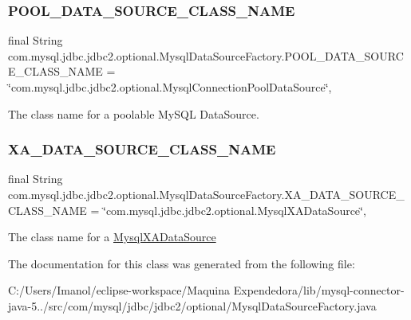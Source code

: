 \subsubsection{\texorpdfstring{P\+O\+O\+L\+\_\+\+D\+A\+T\+A\+\_\+\+S\+O\+U\+R\+C\+E\+\_\+\+C\+L\+A\+S\+S\+\_\+\+N\+A\+ME}{POOL\_DATA\_SOURCE\_CLASS\_NAME}}
{\footnotesize\ttfamily final String com.\+mysql.\+jdbc.\+jdbc2.\+optional.\+Mysql\+Data\+Source\+Factory.\+P\+O\+O\+L\+\_\+\+D\+A\+T\+A\+\_\+\+S\+O\+U\+R\+C\+E\+\_\+\+C\+L\+A\+S\+S\+\_\+\+N\+A\+ME = \char`\"{}com.\+mysql.\+jdbc.\+jdbc2.\+optional.\+Mysql\+Connection\+Pool\+Data\+Source\char`\"{}\hspace{0.3cm}{\ttfamily [static]}, {\ttfamily [protected]}}

The class name for a poolable My\+S\+QL Data\+Source. \mbox{\label{classcom_1_1mysql_1_1jdbc_1_1jdbc2_1_1optional_1_1_mysql_data_source_factory_aedf252dc9f428dc8e170006bb1a85086}} 
\subsubsection{\texorpdfstring{X\+A\+\_\+\+D\+A\+T\+A\+\_\+\+S\+O\+U\+R\+C\+E\+\_\+\+C\+L\+A\+S\+S\+\_\+\+N\+A\+ME}{XA\_DATA\_SOURCE\_CLASS\_NAME}}
{\footnotesize\ttfamily final String com.\+mysql.\+jdbc.\+jdbc2.\+optional.\+Mysql\+Data\+Source\+Factory.\+X\+A\+\_\+\+D\+A\+T\+A\+\_\+\+S\+O\+U\+R\+C\+E\+\_\+\+C\+L\+A\+S\+S\+\_\+\+N\+A\+ME = \char`\"{}com.\+mysql.\+jdbc.\+jdbc2.\+optional.\+Mysql\+X\+A\+Data\+Source\char`\"{}\hspace{0.3cm}{\ttfamily [static]}, {\ttfamily [protected]}}

The class name for a \mbox{\hyperlink{classcom_1_1mysql_1_1jdbc_1_1jdbc2_1_1optional_1_1_mysql_x_a_data_source}{Mysql\+X\+A\+Data\+Source}} 

The documentation for this class was generated from the following file\+:\begin{DoxyCompactItemize}
\item 
C\+:/\+Users/\+Imanol/eclipse-\/workspace/\+Maquina Expendedora/lib/mysql-\/connector-\/java-\/5../src/com/mysql/jdbc/jdbc2/optional/Mysql\+Data\+Source\+Factory.\+java\end{DoxyCompactItemize}
